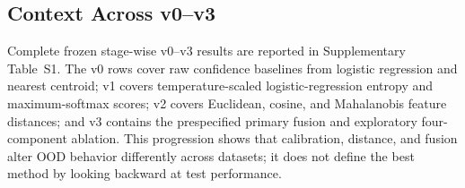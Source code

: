 \subsection{Context Across v0--v3}

Complete frozen stage-wise v0--v3 results are reported in Supplementary Table~S1. The v0 rows cover raw confidence baselines from logistic regression and nearest centroid; v1 covers temperature-scaled logistic-regression entropy and maximum-softmax scores; v2 covers Euclidean, cosine, and Mahalanobis feature distances; and v3 contains the prespecified primary fusion and exploratory four-component ablation. This progression shows that calibration, distance, and fusion alter OOD behavior differently across datasets; it does not define the best method by looking backward at test performance.
